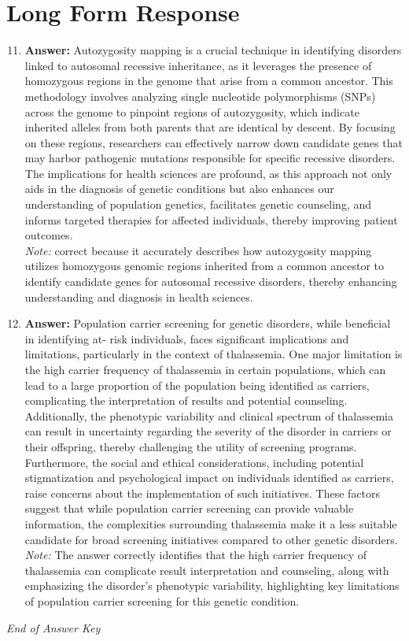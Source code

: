 \documentclass[12pt]{article}
\begin{document}
\section*{Long Form Response}
\begin{enumerate}[label=\arabic*.]
\setcounter{enumi}{10}
\item \textbf{Answer:} Autozygosity mapping is a crucial technique in identifying disorders linked to autosomal recessive inheritance, as it leverages the presence of homozygous regions in the genome that arise from a common ancestor. This methodology involves analyzing single nucleotide polymorphisms (SNPs) across the genome to pinpoint regions of autozygosity, which indicate inherited alleles from both parents that are identical by descent. By focusing on these regions, researchers can effectively narrow down candidate genes that may harbor pathogenic mutations responsible for specific recessive disorders. The implications for health sciences are profound, as this approach not only aids in the diagnosis of genetic conditions but also enhances our understanding of population genetics, facilitates genetic counseling, and informs targeted therapies for affected individuals, thereby improving patient outcomes.
\\ \textit{Note:} correct because it accurately describes how autozygosity mapping utilizes homozygous genomic regions inherited from a common ancestor to identify candidate genes for autosomal recessive disorders, thereby enhancing understanding and diagnosis in health sciences.
\item \textbf{Answer:} Population carrier screening for genetic disorders, while beneficial in identifying at- risk individuals, faces significant implications and limitations, particularly in the context of thalassemia. One major limitation is the high carrier frequency of thalassemia in certain populations, which can lead to a large proportion of the population being identified as carriers, complicating the interpretation of results and potential counseling. Additionally, the phenotypic variability and clinical spectrum of thalassemia can result in uncertainty regarding the severity of the disorder in carriers or their offspring, thereby challenging the utility of screening programs. Furthermore, the social and ethical considerations, including potential stigmatization and psychological impact on individuals identified as carriers, raise concerns about the implementation of such initiatives. These factors suggest that while population carrier screening can provide valuable information, the complexities surrounding thalassemia make it a less suitable candidate for broad screening initiatives compared to other genetic disorders.
\\ \textit{Note:} The answer correctly identifies that the high carrier frequency of thalassemia can complicate result interpretation and counseling, along with emphasizing the disorder's phenotypic variability, highlighting key limitations of population carrier screening for this genetic condition.
\end{enumerate}

\vfill
\noindent\textit{End of Answer Key}
\end{document}
